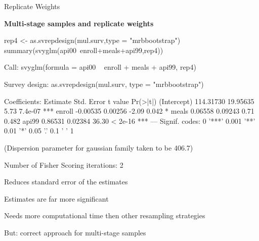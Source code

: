 \documentclass[11pt,german,hideothersubsections]{beamer}
\begin{document}
\begin{frame}[fragile]{Replicate Weights}
\footnotesize{
\begin{center}
\textbf{Multi-stage samples and replicate weights}
\end{center}
\tiny{
\begin{Schunk}
\begin{Sinput}
 rep4 <- as.svrepdesign(mul.surv,type = "mrbbootstrap")
 summary(svyglm(api00~enroll+meals+api99,rep4))
\end{Sinput}
\begin{Soutput}
Call:
svyglm(formula = api00 ~ enroll + meals + api99, rep4)

Survey design:
as.svrepdesign(mul.surv, type = "mrbbootstrap")

Coefficients:
             Estimate Std. Error t value Pr(>|t|)    
(Intercept) 114.31730   19.95635    5.73  7.4e-07 ***
enroll       -0.00535    0.00256   -2.09    0.042 *  
meals         0.06558    0.09243    0.71    0.482    
api99         0.86531    0.02384   36.30  < 2e-16 ***
---
Signif. codes:  0 '***' 0.001 '**' 0.01 '*' 0.05 '.' 0.1 ' ' 1

(Dispersion parameter for gaussian family taken to be 406.7)

Number of Fisher Scoring iterations: 2
\end{Soutput}
\end{Schunk}
}
\begin{itemize}\scriptsize{
\item Reduces standard error of the estimates
\item Estimates are far more significant
\item Needs more computational time then other resampling strategies
\item[$\Rightarrow$] But: correct approach for multi-stage samples}
\end{itemize}
}
\end{frame}



% 
% 
% 
% 
% 
\end{document}
